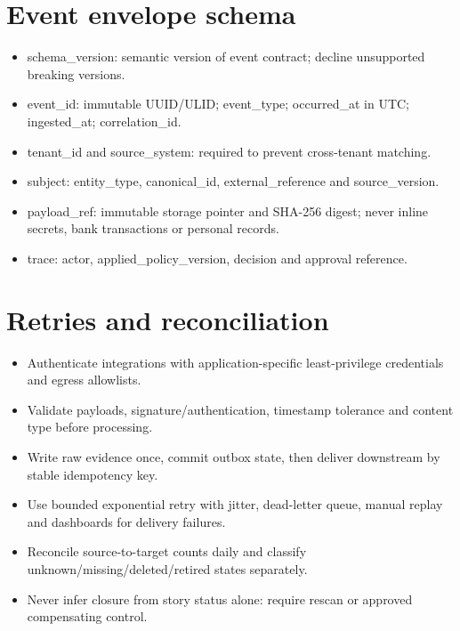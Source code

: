 \documentclass[10pt,letterpaper]{article}
\begin{document}
\section{Event envelope schema}
\begin{itemize}
\item schema\_version: semantic version of event contract; decline unsupported breaking versions.
\item event\_id: immutable UUID/ULID; event\_type; occurred\_at in UTC; ingested\_at; correlation\_id.
\item tenant\_id and source\_system: required to prevent cross-tenant matching.
\item subject: entity\_type, canonical\_id, external\_reference and source\_version.
\item payload\_ref: immutable storage pointer and SHA-256 digest; never inline secrets, bank transactions or personal records.
\item trace: actor, applied\_policy\_version, decision and approval reference.
\end{itemize}
\section{Retries and reconciliation}
\begin{itemize}
\item Authenticate integrations with application-specific least-privilege credentials and egress allowlists.
\item Validate payloads, signature/authentication, timestamp tolerance and content type before processing.
\item Write raw evidence once, commit outbox state, then deliver downstream by stable idempotency key.
\item Use bounded exponential retry with jitter, dead-letter queue, manual replay and dashboards for delivery failures.
\item Reconcile source-to-target counts daily and classify unknown/missing/deleted/retired states separately.
\item Never infer closure from story status alone: require rescan or approved compensating control.
\end{itemize}
\end{document}
